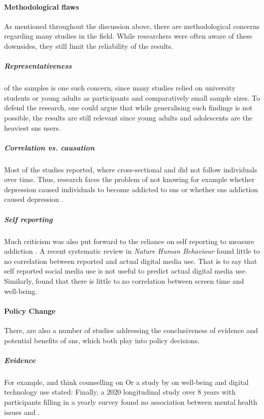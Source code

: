 \paragraph{Methodological flaws} As mentioned throughout the discussion above, there are methodological concerns regarding many studies in the field. 
While researchers were often aware of these downsides, they still limit the reliability of the results.
\subparagraph{Representativeness} of the samples is one such concern, since many studies relied on university students or young adults as participants and comparatively small sample sizes. 
To defend the research, one could argue that while generalising such findings is not possible, the results are still relevant since young adults and adolescents are the heaviest \gls{sns} users. 

\subparagraph{Correlation vs. causation} Most of the studies reported, where cross-sectional and did not follow individuals over time. 
Thus, research faces the problem of not knowing for example whether depression caused individuals to become addicted to \gls{sns} or whether \gls{sns} addiction caused depression \citep{carbonell_critical_2017}.

\subparagraph{Self reporting} Much criticism was also put forward to the reliance on self reporting to measure addiction \citep{geyer_absence_2021}. 
A recent systematic review in \emph{Nature Human Behaviour} \citep{parry_systematic_2021} found  little to no correlation between reported and actual digital media use. 
That is to say that self reported social media use is not useful to predict actual digital media use. 
Similarly, \citet{orben_screens_2019} found that there is little to no correlation between screen time and well-being.

\paragraph{Policy Change} There, are also a number of studies addressing the conclusiveness of evidence and potential benefits of \gls{sns}, which both play into policy decisions.

\subparagraph{Evidence}
For example, \citet{jelenchick_facebook_2013}  and think counselling on 
Or a study by \citet{orben_association_2019} on well-being and digital technology use stated: 
Finally, a 2020 longitudinal study over 8 years with participants filling in a yearly survey found no association between mental health issues and  \citep{coyne_does_2020}.

